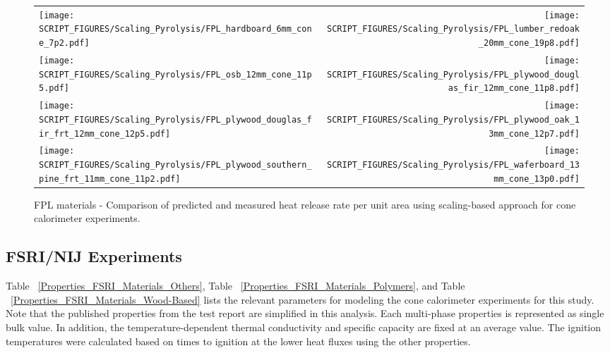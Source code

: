 \begin{figure}[p]
\begin{tabular*}{\textwidth}{l@{\extracolsep{\fill}}r}
\texttt{[image: SCRIPT\_FIGURES/Scaling\_Pyrolysis/FPL\_hardboard\_6mm\_cone\_7p2.pdf]} &
\texttt{[image: SCRIPT\_FIGURES/Scaling\_Pyrolysis/FPL\_lumber\_redoak\_20mm\_cone\_19p8.pdf]} \\
\texttt{[image: SCRIPT\_FIGURES/Scaling\_Pyrolysis/FPL\_osb\_12mm\_cone\_11p5.pdf]} &
\texttt{[image: SCRIPT\_FIGURES/Scaling\_Pyrolysis/FPL\_plywood\_douglas\_fir\_12mm\_cone\_11p8.pdf]} \\
\texttt{[image: SCRIPT\_FIGURES/Scaling\_Pyrolysis/FPL\_plywood\_douglas\_fir\_frt\_12mm\_cone\_12p5.pdf]} &
\texttt{[image: SCRIPT\_FIGURES/Scaling\_Pyrolysis/FPL\_plywood\_oak\_13mm\_cone\_12p7.pdf]} \\
\texttt{[image: SCRIPT\_FIGURES/Scaling\_Pyrolysis/FPL\_plywood\_southern\_pine\_frt\_11mm\_cone\_11p2.pdf]} &
\texttt{[image: SCRIPT\_FIGURES/Scaling\_Pyrolysis/FPL\_waferboard\_13mm\_cone\_13p0.pdf]} \\
\end{tabular*}
\caption[HRRPUA of FPL Materials using scaling model]
{FPL materials - Comparison of predicted and measured heat release rate per unit area using scaling-based approach for cone calorimeter experiments.}
\label{FPL_Materials_HRR_Wood-Based}
\end{figure}

\clearpage

\subsection{FSRI/NIJ Experiments}\label{sec_FSRI_NIJ_Materials}

Table ~\ref{Properties_FSRI_Materials_Others}, Table ~\ref{Properties_FSRI_Materials_Polymers}, and Table ~\ref{Properties_FSRI_Materials_Wood-Based} lists the relevant parameters for modeling the cone calorimeter experiments for this study.
Note that the published properties from the test report are simplified in this analysis. Each multi-phase properties is represented as single bulk value.
In addition, the temperature-dependent thermal conductivity and specific capacity are fixed at an average value.
The ignition temperatures were calculated based on times to ignition at the lower heat fluxes using the other properties.

